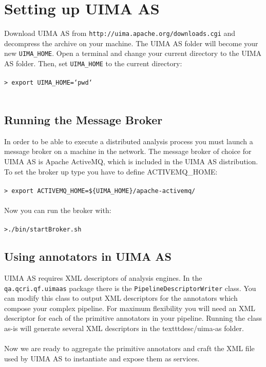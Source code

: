 \documentclass{wileysev}
\begin{document}
\section[Setting up UIMA AS]{Setting up UIMA AS}

Download UIMA AS from \texttt{http://uima.apache.org/downloads.cgi} and decompress the archive on your machine. The UIMA AS folder will become your new \texttt{UIMA\_HOME}. Open a terminal and change your current directory to the UIMA AS folder. Then, set \texttt{UIMA\_HOME} to the current directory:
\\\\
\texttt{> export UIMA\_HOME=`pwd`}
\\\\
\subsection{Running the Message Broker}
In order to be able to execute a distributed analysis process you must launch a message broker on a machine in the network. The message broker of choice for UIMA AS is Apache ActiveMQ, which is included in the UIMA AS distribution. To set the broker up type you have to define ACTIVEMQ\_HOME:
\\\\
\texttt{> export ACTIVEMQ\_HOME=\$\{UIMA\_HOME\}/apache-activemq/}
\\\\
Now you can run the broker with:
\\\\
\texttt{>./bin/startBroker.sh}

\subsection{Using annotators in UIMA AS}
UIMA AS requires XML descriptors of analysis engines. In the \texttt{qa.qcri.qf.uimaas} package there is the \texttt{PipelineDescriptorWriter} class. You can modify this class to output XML descriptors for the annotators which compose your complex pipeline. For maximum flexibility you will need an XML descriptor for each of the primitive annotators in your pipeline. Running the class as-is will generate several XML descriptors in the texttt{desc/uima-as} folder.
\\\\
Now we are ready to aggregate the primitive annotators and craft the XML file used by UIMA AS to instantiate and expose them as services.
\end{document}
